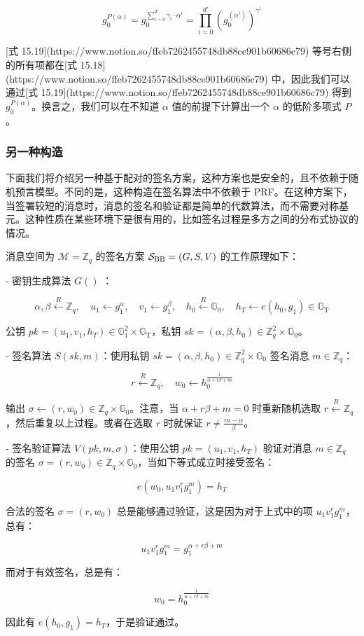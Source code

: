 \[
g_0^{P(\alpha)}=g_0^{\sum_{i=0}^{d'}\gamma_i\cdot\alpha^i}=\prod_{i=0}^{d'}(g_0^{(\alpha^i)})^{\gamma^i}
\]

[式 15.19](https://www.notion.so/ffeb7262455748db88ce901b60686c79) 等号右侧的所有项都在[式 15.18](https://www.notion.so/ffeb7262455748db88ce901b60686c79) 中，因此我们可以通过[式 15.19](https://www.notion.so/ffeb7262455748db88ce901b60686c79) 得到 $g_0^{P(\alpha)}$。换言之，我们可以在不知道 $\alpha$ 值的前提下计算出一个 $\alpha$ 的低阶多项式 $P$。

\subsubsection{另一种构造}

下面我们将介绍另一种基于配对的签名方案，这种方案也是安全的，且不依赖于随机预言模型。不同的是，这种构造在签名算法中不依赖于 PRF。在这种方案下，当签署较短的消息时，消息的签名和验证都是简单的代数算法，而不需要对称基元。这种性质在某些环境下是很有用的，比如签名过程是多方之间的分布式协议的情况。

消息空间为 $\mathcal{M}=\mathbb{Z}_q$ 的签名方案 $\mathcal{S}_{\rm BB}=(G,S,V)$ 的工作原理如下：

- 密钥生成算法 $G()$ ：
    
    \[
    \alpha,\beta\overset{R}\leftarrow\mathbb{Z}_q,
    \quad
    u_1\leftarrow g_1^\alpha,
    \quad
    v_1\leftarrow g_1^\beta,
    \quad
    h_0\overset{R}\leftarrow \mathbb{G}_0,
    \quad
    h_T\leftarrow e(h_0,g_1)\in\mathbb{G}_\mathrm{T}
    \]
    
    公钥 $pk=(u_1,v_1, h_T)\in\mathbb{G}_1^2\times\mathbb{G}_\mathrm{T}$，私钥 $sk=(\alpha,\beta,h_0)\in\mathbb{Z}_q^2\times\mathbb{G}_0$。
    
- 签名算法 $S(sk,m)$：使用私钥 $sk=(\alpha,\beta,h_0)\in\mathbb{Z}_q^2\times\mathbb{G}_0$ 签名消息 $m\in\mathbb{Z}_q$：
    
    \[
    r\overset{R}\leftarrow \mathbb{Z}_q,
    \quad
    w_0\leftarrow h_0^{\frac{1}{\alpha+r\beta+m}}
    \]
    
    输出 $\sigma \leftarrow (r,w_0)\in\mathbb{Z}_q\times\mathbb{G}_0$。注意，当 $\alpha+r\beta+m=0$ 时重新随机选取 $r\overset{R}\leftarrow \mathbb{Z}_q$，然后重复以上过程。或者在选取 $r$ 时就保证 $r\neq\frac{m-\alpha}{\beta}$。
    
- 签名验证算法 $V(pk,m,\sigma)$：使用公钥 $pk=(u_1,v_1,h_T)$ 验证对消息 $m\in\mathbb{Z}_q$ 的签名 $\sigma=(r,w_0)\in\mathbb{Z}_q\times\mathbb{G}_0$，当如下等式成立时接受签名：
    
    \[
    e(w_0,u_1v_1^rg_1^m)=h_T
    \]
    

合法的签名 $\sigma=(r,w_0)$ 总是能够通过验证，这是因为对于上式中的项 $u_1v_1^rg_1^m$，总有：

\[
u_1v_1^rg_1^m=g_1^{\alpha+r\beta+m}
\]

而对于有效签名，总是有：

\[
w_0=h_0^{\frac{1}{\alpha+r\beta+m}}
\]

因此有 $e(h_0,g_1)=h_T$，于是验证通过。